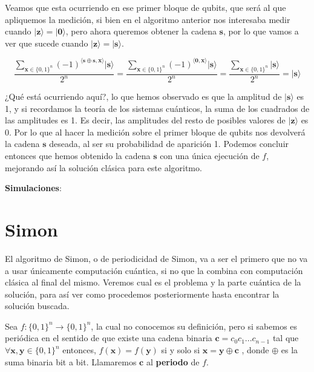  Veamos que esta ocurriendo en ese primer bloque de qubits, que será al que apliquemos la medición, si bien en el algoritmo anterior nos interesaba medir cuando $|\mathbf{z}\rangle=|\mathbf{0}\rangle$, pero ahora queremos obtener la cadena $\mathbf{s}$, por lo que vamos a ver que sucede cuando $|\mathbf{z}\rangle=|\mathbf{s}\rangle$.

 \begin{equation}
    \dfrac{\sum_{\mathbf{x} \in \{0,1\}^{n}}(-1)^{\langle\mathbf{s}\oplus \mathbf{s},\mathbf{x}\rangle}|\mathbf{s}\rangle}{2^{n}} = \dfrac{\sum_{\mathbf{x} \in \{0,1\}^{n}}(-1)^{\langle\mathbf{0},\mathbf{x}\rangle}|\mathbf{s}\rangle}{2^{n}}= \dfrac{\sum_{\mathbf{x} \in \{0,1\}^{n}}|\mathbf{s}\rangle}{2^{n}} = |\mathbf{s}\rangle
 \end{equation}

 \vspace{5pt}

 ¿Qué está ocurriendo aquí?, lo que hemos observado es que la amplitud de $|\mathbf{s}\rangle$ es 1, y si recordamos la teoría de los sistemas cuánticos, la suma de los cuadrados de las amplitudes es 1. Es decir, las amplitudes del resto de posibles valores de $|\mathbf{z}\rangle$ es 0. Por lo que al hacer la medición sobre el primer bloque de qubits nos devolverá la cadena $\mathbf{s}$ deseada, al ser su probabilidad de aparición 1. Podemos concluir entonces que hemos obtenido la cadena $\mathbf{s}$ con una única ejecución de $f$, mejorando así la solución clásica para este algoritmo.\newline

 \textbf{Simulaciones}:\newline


\section{Simon}
\label{Sec3.5:Simon}
 El algoritmo de Simon, o de periodicidad de Simon, va a ser el primero que no va a usar únicamente computación cuántica, si no que la combina con computación clásica al final del mismo. Veremos cual es el problema y la parte cuántica de la solución, para así ver como procedemos posteriormente hasta encontrar la solución buscada. \newline

 Sea $f:\{0,1\}^{n} \rightarrow\{0,1\}^{n}$, la cual no conocemos su definición, pero si sabemos es periódica en el sentido de que existe una cadena binaria $\mathbf{c}=c_{0}c_{1}...c_{n-1}$ tal que $\forall \mathbf{x},\mathbf{y} \in \{0,1\}^{n}$ entonces, $f(\mathbf{x})=f(\mathbf{y})$ si y solo si $\mathbf{x}=\mathbf{y}\oplus\mathbf{c}$ , donde $\oplus$ es la suma binaria bit a bit. Llamaremos $\mathbf{c}$ al \textbf{periodo} de $f$. \newline

